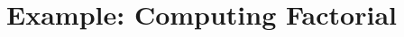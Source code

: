 \documentclass{article}
\begin{document}
\section{Example: Computing Factorial}

\begin{drawstack}[scale=0.8]
  \startframe
  \startframe
  \cell{$\vdots$}
  \startframe
\end{drawstack}
\end{document}
